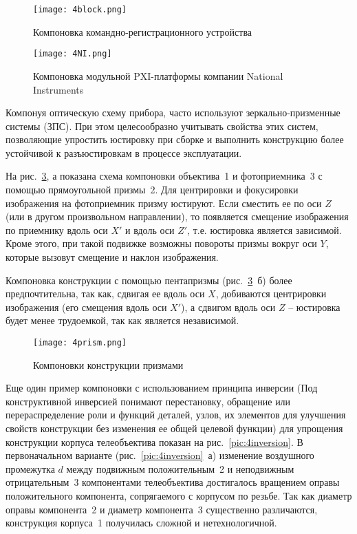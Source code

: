\begin{figure}[H]
	\caption{Компоновка командно-регистрационного устройства}
	\texttt{[image: 4block.png]}
	\label{pic:4block}
\end{figure}

\begin{figure}[H]
	\caption{ Компоновка модульной PXI-платформы компании National Instruments }
	\texttt{[image: 4NI.png]}
	\label{pic:4NI}
\end{figure}

Компонуя оптическую схему прибора, часто используют зеркально-призменные системы (ЗПС). При этом целесообразно учитывать свойства этих систем, позволяющие упростить юстировку при сборке и выполнить конструкцию более устойчивой к разъюстировкам в процессе эксплуатации.

На рис.~\ref{pic:4prism}, а показана схема компоновки объектива~1 и фотоприемника~3 с помощью прямоугольной призмы~2. Для центрировки и фокусировки изображения на фотоприемник призму юстируют. Если сместить ее по оси $ Z $ (или в другом произвольном направлении), то появляется смещение изображения по приемнику вдоль оси $ X' $ и вдоль оси $ Z' $, т.е. юстировка является зависимой. Кроме этого, при такой подвижке возможны повороты призмы вокруг оси $ Y $, которые вызовут смещение и наклон изображения.

Компоновка конструкции с помощью пентапризмы (рис.~\ref{pic:4prism}~б) более предпочтительна, так как, сдвигая ее вдоль оси $ X $, добиваются центрировки изображения (его смещения вдоль оси $ X' $), а сдвигом вдоль оси $ Z $ -- юстировка будет менее трудоемкой, так как является независимой.

\begin{figure}[h!]
	\caption{Компоновки конструкции призмами}
	\texttt{[image: 4prism.png]}
	\label{pic:4prism}
\end{figure}

Еще один пример компоновки с использованием принципа инверсии (Под конструктивной инверсией понимают перестановку, обращение или перераспределение роли и функций деталей, узлов, их элементов для улучшения свойств конструкции без изменения ее общей целевой функции) для упрощения конструкции корпуса телеобъектива показан на рис.~\ref{pic:4inversion}. В первоначальном варианте (рис.~\ref{pic:4inversion}~а) изменение воздушного промежутка $ d $ между подвижным положительным~2 и неподвижным отрицательным~3 компонентами телеобъектива достигалось вращением оправы положительного компонента, сопрягаемого с корпусом по резьбе. Так как диаметр оправы компонента~2 и диаметр компонента~3 существенно различаются, конструкция корпуса~1 получилась сложной и нетехнологичной.

